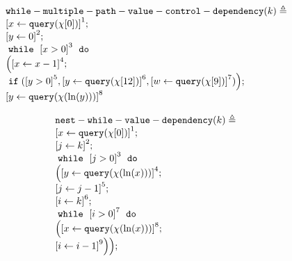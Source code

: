             \begin{example}
                \[
                    \begin{array}{l}
                    \kw{while-multiple-path-value-control-dependency}(k) \triangleq\\
                        \clabel{ \assign{x}{\query(\chi[0])}}^{1} ; \\
                        \clabel{\assign{y}{0} }^{2} ; \\
                            \ewhile ~ \clabel{x > 0}^{3} ~ \edo ~ \\
                            \Big(
                             \clabel{\assign{x}{x-1}}^{4} ;\\
                             \eif(\clabel{y > 0}^{5}, 
                             \clabel{\assign{y}{\query(\chi[12])}}^{6}, 
                             \clabel{\assign{w}{\query(\chi[9])}}^{7})                             
                             \Big);\\
                             \clabel{\assign{y}{\query(\chi(\ln(y)))} }^{8} 
                        \end{array}
                    \]
                \end{example}
                \begin{example}
                    \[
                    \begin{array}{l}
                    \kw{nest-while-value-dependency}(k) \triangleq \\
                        \clabel{ \assign{x}{\query(\chi[0])}}^{1} ; \\
                        \clabel{\assign{j}{k} }^{2} ; \\
                            \ewhile ~ \clabel{j > 0}^{3} ~ \edo ~ \\
                            \Big(
                             \clabel{\assign{y}{\query(\chi(\ln(x)))} }^{4}  ; \\
                             \clabel{\assign{j}{j-1}}^{5} ;\\
                             \clabel{\assign{i}{k}}^{6} ;\\
                             \ewhile ~ \clabel{i > 0}^{7} ~ \edo ~ \\
                             \Big(
                              \clabel{\assign{x}{\query(\chi(\ln(x)))} }^{8}  ; \\
                              \clabel{\assign{i}{i-1}}^{9}
                              \Big) \Big);
                        \end{array}
                    \]
                    \end{example}

